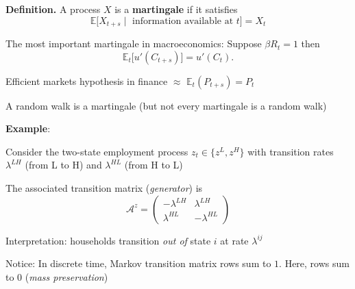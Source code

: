 \documentclass[11pt, aspectratio=169]{beamer}
\newenvironment{witemize}{\itemize\addtolength{\itemsep}{10pt}}{\enditemize}
\begin{document}
\begin{frame}{}

\textbf{Definition.} A process $X$ is a \textbf{martingale} if it satisfies
\begin{equation*}
	\mathbb E \Big[ X_{t + s} \mid \text{ information available at } t \Big] = X_t
\end{equation*}

\vspace{5mm}
\begin{witemize}
\item The most important martingale in macroeconomics: Suppose $\beta R_t = 1$ then 
\begin{equation*}
	\mathbb E_t \Big[ u'(C_{t + s}) \Big] = u'(C_t).
\end{equation*}

\item Efficient markets hypothesis in finance $\approx$ $\mathbb E_t (P_{t + s}) = P_t$

\item A random walk is a martingale (but not every martingale is a random walk)
\end{witemize}
\end{frame}



\begin{frame}{}

\textbf{Example}: 

\vspace{5mm}
\begin{witemize}
\item Consider the two-state employment process $z_t \in \{z^L, z^H\}$ with transition rates $\lambda^{LH}$ (from L to H) and $\lambda^{HL}$ (from H to L)

\item The associated transition matrix (\textit{generator}) is 
\begin{equation*}
	\mathcal A^z = \begin{pmatrix} - \lambda^{LH} & \lambda^{LH} \\ \lambda^{HL} & -\lambda^{HL} \end{pmatrix}
\end{equation*}

\item Interpretation: households transition \textit{out of} state $i$ at rate $\lambda^{ij}$

\item Notice: In discrete time, Markov transition matrix rows sum to $1$. Here, rows sum to $0$ (\textit{mass preservation})
\end{witemize}
\end{frame}
\end{document}
